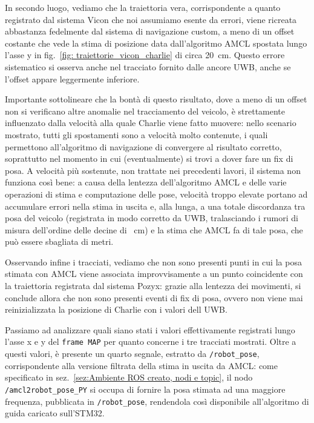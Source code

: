In secondo luogo, vediamo che la traiettoria vera, corrispondente a quanto registrato dal sistema Vicon che noi assumiamo esente da errori, viene ricreata abbastanza fedelmente dal sistema di navigazione custom, a meno di un offset costante che vede la stima di posizione data dall'algoritmo AMCL spostata lungo l'asse y in fig.~\ref{fig: traiettorie_vicon_charlie} di circa \SI{20}{\centi \metre}.
Questo errore sistematico si osserva anche nel tracciato fornito dalle ancore UWB, anche se l'offset appare leggermente inferiore.

Importante sottolineare che la bontà di questo risultato, dove a meno di un offset non si verificano altre anomalie nel tracciamento del veicolo, è strettamente influenzato dalla velocità alla quale Charlie viene fatto muovere: nello scenario mostrato, tutti gli spostamenti sono a velocità molto contenute, i quali permettono all'algoritmo di navigazione di convergere al risultato corretto, soprattutto nel momento in cui (eventualmente) si trovi a dover fare un fix di posa. 
A velocità più sostenute, non trattate nei precedenti lavori, il sistema non funziona così bene: a causa della lentezza dell'algoritmo AMCL e delle varie operazioni di stima e computazione delle pose, velocità troppo elevate portano ad accumulare errori nella stima in uscita e, alla lunga, a una totale discordanza tra posa del veicolo (registrata in modo corretto da UWB, tralasciando i rumori di misura dell'ordine delle decine di \SI{}{\centi \metre}) e la stima che AMCL fa di tale posa, che può essere sbagliata di metri.

Osservando infine i tracciati, vediamo che non sono presenti punti in cui la posa stimata con AMCL viene associata improvvisamente a un punto coincidente con la traiettoria registrata dal sistema Pozyx: grazie alla lentezza dei movimenti, si conclude allora che non sono presenti eventi di fix di posa, ovvero non viene mai reinizializzata la posizione di Charlie con i valori dell UWB.

\vspace{0.5cm}
Passiamo ad analizzare quali siano stati i valori effettivamente registrati lungo l'asse x e y del \verb|frame MAP| per quanto concerne i tre tracciati mostrati. 
Oltre a questi valori, è presente un quarto segnale, estratto da \verb|/robot_pose|, corrispondente alla versione filtrata della stima in uscita da AMCL: come specificato in sez.~\ref{sez:Ambiente ROS creato, nodi e topic}, il nodo \verb|/amcl2robot_pose_PY| si occupa di fornire la posa stimata ad una maggiore frequenza, pubblicata in \verb|/robot_pose|, rendendola cos\`i disponibile all'algoritmo di guida caricato sull'STM32.

